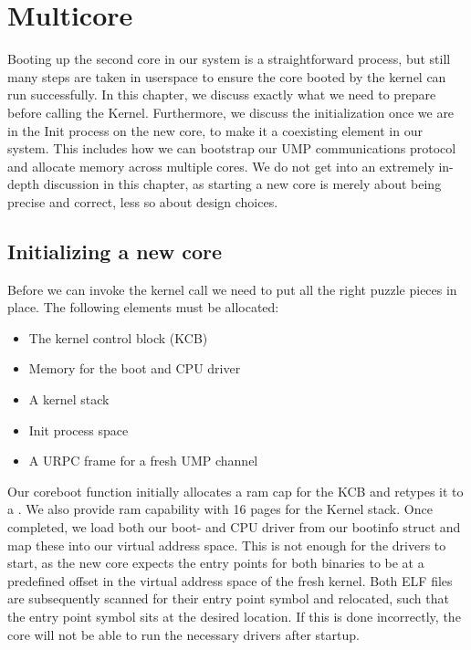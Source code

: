 
\section{Multicore}\label{multicore}

Booting up the second core in our system is a straightforward process, but still many steps are taken in userspace to ensure the core booted by the kernel can run successfully. In this chapter, we discuss exactly what we need to prepare before calling the Kernel. Furthermore, we discuss the initialization once we are in the Init process on the new core, to make it a coexisting element in our system. This includes how we can bootstrap our UMP communications protocol and allocate memory across multiple cores. We do not get into an extremely in-depth discussion in this chapter, as starting a new core is merely about being precise and correct, less so about design choices.

\subsection{Initializing a new core}

Before we can invoke the kernel call  we need to put all the right puzzle pieces in place. The following elements must be allocated:
\begin{itemize}
    \item The kernel control block (KCB)
    \item Memory for the boot and CPU driver
    \item A kernel stack
    \item Init process space 
    \item A URPC frame for a fresh UMP channel
\end{itemize}

Our coreboot function initially allocates a ram cap for the KCB and retypes it to a . We also provide ram capability with 16 pages for the Kernel stack. Once completed, we load both our boot- and CPU driver from our bootinfo struct and map these into our virtual address space. This is not enough for the drivers to start, as the new core expects the entry points for both binaries to be at a predefined offset in the virtual address space of the fresh kernel. Both ELF files are subsequently scanned for their entry point symbol and relocated, such that the entry point symbol sits at the desired location. If this is done incorrectly, the core will not be able to run the necessary drivers after startup.
